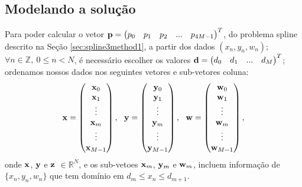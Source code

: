 \subsection{Modelando a solução}
\label{subsec:all}
Para poder calcular o vetor $\VECTOR{p}=\left(\begin{matrix}p_0 & p_1 & p_2 & ...  & p_{4M-1}\end{matrix}\right)^T$, 
do problema spline descrito  na Seção \ref{sec:spline3method1}, a partir dos dados $(x_n,y_n,w_n)$; 
$\forall n \in \mathbb{Z},~0\leq n < N$,
é necessário escolher os valores $\VECTOR{d}=\left(\begin{matrix}d_0 & d_1 & ...  & d_{M}\end{matrix}\right)^T$;
ordenamos nossos dados nos seguintes vetores e sub-vetores coluna:
\begin{equation}
\VECTOR{x}=\left(\begin{matrix}\VECTOR{x}_0 \\ \VECTOR{x}_1 \\ \vdots  \\ \VECTOR{x}_{m}\\ \vdots  \\ \VECTOR{x}_{M-1}\end{matrix}\right),~~
\VECTOR{y}=\left(\begin{matrix}\VECTOR{y}_0 \\ \VECTOR{y}_1 \\ \vdots  \\ \VECTOR{y}_{m}\\ \vdots  \\ \VECTOR{y}_{M-1}\end{matrix}\right),~~
\VECTOR{w}=\left(\begin{matrix}\VECTOR{w}_0 \\ \VECTOR{w}_1 \\ \vdots  \\ \VECTOR{w}_{m}\\ \vdots  \\ \VECTOR{w}_{M-1}\end{matrix}\right),
\end{equation}
onde $\VECTOR{x}$, $\VECTOR{y}$ e  $\VECTOR{z}$ $\in \mathbb{R}^{N}$, e os sub-vetoes $\VECTOR{x}_m$, $\VECTOR{y}_m$ e $\VECTOR{w}_m$, incluem informação de $\{x_n,y_n,w_n\}$
que tem  domínio em $d_{m} \leq x_n \leq d_{m+1}$.



